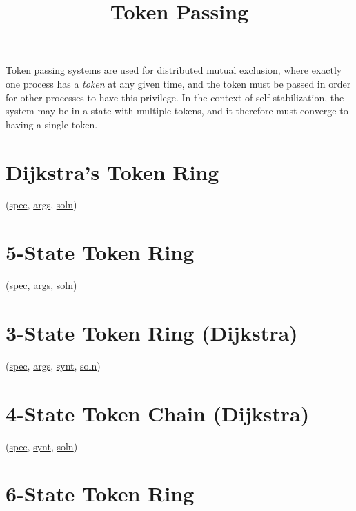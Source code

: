 
\title{Token Passing}
\date{}




Token passing systems are used for distributed mutual exclusion, where exactly one process has a \textit{token} at any given time, and the token must be passed in order for other processes to have this privilege.
In the context of self-stabilization, the system may be in a state with multiple tokens, and it therefore must converge to having a single token.

\tableofcontents

\section{Dijkstra's Token Ring}
\label{sec:TokenRingDijkstra}

(\href{\examplespec/TokenRingDijkstra.prot}{spec},
\href{\examplesett/TokenRingDijkstra.prot}{args},
\href{\examplesoln/TokenRingDijkstra.prot}{soln})

\section{5-State Token Ring}
\label{sec:TokenRingFiveState}

(\href{\examplespec/TokenRing.prot}{spec},
\href{\examplesett/TokenRingFiveState.args}{args},
\href{\examplesoln/TokenRingFiveState.prot}{soln})

\section{3-State Token Ring (Dijkstra)}
\label{sec:TokenRingThreeState}

(\href{\examplespec/TokenRingThreeState.prot}{spec},
\href{\examplesett/TokenRingThreeState.args}{args},
\href{\examplesynt/TokenRingThreeState.prot}{synt},
\href{\examplesoln/TokenRingThreeState.prot}{soln})

\section{4-State Token Chain (Dijkstra)}
\label{sec:TokenChainDijkstra}

(\href{\examplespec/TokenChainDijkstra.prot}{spec},
\href{\examplesynt/TokenChainDijkstra.prot}{synt},
\href{\examplesoln/TokenChainDijkstra.prot}{soln})

\section{6-State Token Ring}
\label{sec:TokenRingSixState}

